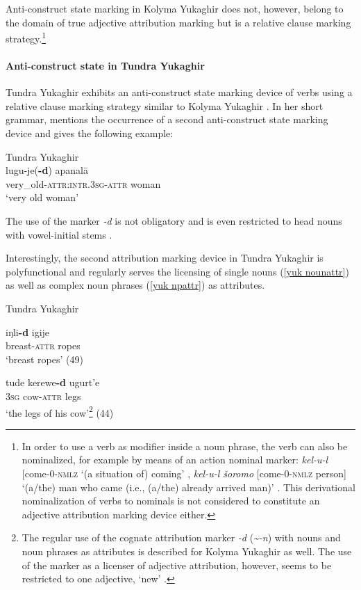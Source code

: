 Anti\hyp{}construct state marking in Kolyma Yukaghir does not, however, belong to the domain of true adjective attribution marking but is a relative clause marking strategy.\footnote{In order to use a verb as modifier inside a noun phrase, the verb can also be nominalized, for example by means of an action nominal marker: \textit{kel-u-l} [come-0-\textsc{nmlz} ‘(a situation of) coming’ \citep[147]{maslova2003b}, \textit{kel-u-l šoromo} [come-0-\textsc{nmlz} person] ‘(a/the) man who came (i.e., (a/the) already arrived man)’ \citep[67]{maslova2003b}. This derivational nominalization of verbs to nominals is not considered to constitute an adjective attribution marking device either.}

\paragraph*{Anti\hyp{}construct state in Tundra Yukaghir}
Tundra Yukaghir exhibits an anti\hyp{}construct state marking device of verbs using a relative clause marking strategy similar to Kolyma Yukaghir \citep[49–50, passim]{maslova2003a}. In her short grammar, \citet{maslova2003a} mentions the occurrence of a second anti\hyp{}construct state marking device and gives the following example:
\begin{exe}
\ex 	
{\rm Tundra Yukaghir \citep[50]{maslova2003a}}\\
\gll 	lugu-je(\textbf{-d}) apanalā\\
	very\_old-\textsc{attr:intr.3sg}-\textsc{attr} woman\\
\glt	‘very old woman’
\end{exe}
The use of the marker \textit{-d} is not obligatory and is even restricted to head nouns with vowel-initial stems \citep[50]{maslova2003a}.

Interestingly, the second attribution marking device in Tundra Yukaghir is polyfunctional and regularly serves the licensing of single nouns (\ref{yuk nounattr}) as well as complex noun phrases (\ref{yuk npattr}) as attributes.
\begin{exe}
\ex 
{\rm Tundra Yukaghir \citep{maslova2003a}}
\begin{xlist}
\ex
\label{yuk nounattr}
\gll	iŋli\textbf{-d} igije\\
	breast-\textsc{attr} ropes\\
\glt	‘breast ropes’ (49)

\ex
\label{yuk npattr}
\gll	tude kerewe\textbf{-d} ugurt'e\\
	\textsc{3sg} cow-\textsc{attr} legs\\
\glt	‘the legs of his cow’\footnote{The regular use of the cognate attribution marker \textit{-d} (\textit{\textasciitilde-n}) with nouns and noun phrases as attributes is described for Kolyma Yukaghir as well. The use of the marker as a licenser of adjective attribution, however, seems to be restricted to one adjective, ‘new’ \citep[71]{maslova2003b}.} (44)
\end{xlist}
\end{exe}

